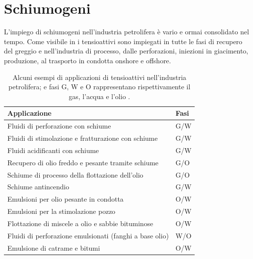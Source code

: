 \section{Schiumogeni}
L'impiego di schiumogeni nell'industria petrolifera è vario e ormai consolidato nel tempo. Come visibile in  i tensioattivi sono impiegati in tutte le fasi di recupero del greggio e nell'industria di processo, dalle perforazioni, iniezioni in giacimento, produzione, al trasporto in condotta onshore e offshore.

\begin{table}[htbp]
    \small
    \centering
    \caption{Alcuni esempi di applicazioni di tensioattivi nell'industria petrolifera; e fasi G, W e O rappresentano rispettivamente il gas, l'acqua e l'olio \parencite{schramm2006emulsions}.}
    \label{tab:surfactantapplications}
\begin{tabular}{p{}p{}}
\hline
{\bf Applicazione}                                                         & {\textbf{Fasi}}           \\ \hline
Fluidi di perforazione con schiume                                         & G/W                    \\
Fluidi di stimolazione e fratturazione con schiume                         & G/W                    \\
Fluidi acidificanti con schiume                                            & G/W                    \\
Recupero di olio freddo e pesante tramite schiume                          & G/O                    \\
Schiume di processo della flottazione dell'olio                            & G/O                    \\
Schiume antincendio                                                        & G/W                    \\
Emulsioni per olio pesante in condotta                                     & O/W                    \\
Emulsioni per la stimolazione pozzo                                        & O/W                    \\
Flottazione di miscele a olio e sabbie bituminose                          & O/W                    \\
Fluidi di perforazione emulsionati (fanghi a base olio)                    & W/O                    \\
Emulsione di catrame e bitumi                                              & O/W                    \\

\end{tabular}
\end{table}
